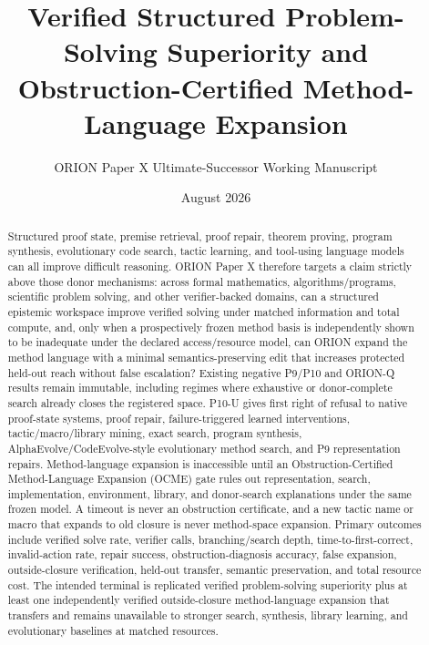 \documentclass[11pt]{article}
\title{Verified Structured Problem-Solving Superiority and Obstruction-Certified Method-Language Expansion}
\author{ORION Paper X Ultimate-Successor Working Manuscript}
\date{August 2026}
\begin{document}
\maketitle

\begin{abstract}
Structured proof state, premise retrieval, proof repair, theorem proving, program synthesis, evolutionary code search, tactic learning, and tool-using language models can all improve difficult reasoning. ORION Paper X therefore targets a claim strictly above those donor mechanisms: across formal mathematics, algorithms/programs, scientific problem solving, and other verifier-backed domains, can a structured epistemic workspace improve verified solving under matched information and total compute, and, only when a prospectively frozen method basis is independently shown to be inadequate under the declared access/resource model, can ORION expand the method language with a minimal semantics-preserving edit that increases protected held-out reach without false escalation? Existing negative P9/P10 and ORION-Q results remain immutable, including regimes where exhaustive or donor-complete search already closes the registered space. P10-U gives first right of refusal to native proof-state systems, proof repair, failure-triggered learned interventions, tactic/macro/library mining, exact search, program synthesis, AlphaEvolve/CodeEvolve-style evolutionary method search, and P9 representation repairs. Method-language expansion is inaccessible until an Obstruction-Certified Method-Language Expansion (OCME) gate rules out representation, search, implementation, environment, library, and donor-search explanations under the same frozen model. A timeout is never an obstruction certificate, and a new tactic name or macro that expands to old closure is never method-space expansion. Primary outcomes include verified solve rate, verifier calls, branching/search depth, time-to-first-correct, invalid-action rate, repair success, obstruction-diagnosis accuracy, false expansion, outside-closure verification, held-out transfer, semantic preservation, and total resource cost. The intended terminal is replicated verified problem-solving superiority plus at least one independently verified outside-closure method-language expansion that transfers and remains unavailable to stronger search, synthesis, library learning, and evolutionary baselines at matched resources.
\end{abstract}




















\end{document}
